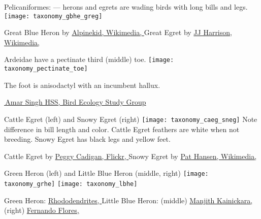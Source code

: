 \documentclass[t]{beamer}
\begin{document}
\begin{frame}{Pelicaniformes:  —  herons and egrets are wading birds with long bills and legs.}
\vspace{-0.5\baselineskip}
\centering
\texttt{[image: taxonomy\_gbhe\_greg]}

\vfilll
\tiny Great Blue Heron by \href{https://en.wikipedia.org/wiki/File:Great_Blue_Heron_at_Sunnyvale_California.jpg}{Alpinekid, Wikimedia, } \hfill Great Egret by \href{https://en.wikipedia.org/wiki/File:Ardea_modesta.jpg}{JJ Harrison, Wikimedia, }
\end{frame}

\begin{frame}{Ardeidae have a pectinate third (middle) toe.}
\texttt{[image: taxonomy\_pectinate\_toe]}

The foot is anisodactyl with an incumbent hallux.

\tinyfill \href{https://besgroup.org/2021/09/16/cattle-egret-pectinate-claw/}{\textcopyright\,Amar Singh HSS, Bird Ecology Study Group}

\end{frame}

\begin{frame}{Cattle Egret (left) and Snowy Egret (right)}
\texttt{[image: taxonomy\_caeg\_sneg]}
Note difference in bill length and color. Cattle Egret feathers are white when not breeding. Snowy Egret has black legs and yellow feet.

\vfilll

\tiny Cattle Egret by \href{https://flickr.com/photos/peggycadigan/14158508211}{Peggy Cadigan, Flickr, } \hfill Snowy Egret by \href{https://commons.wikimedia.org/wiki/File:Snowy_Egret-1.jpg}{Pat Hansen, Wikimedia, }
\end{frame}

\begin{frame}{Green Heron (left) and Little Blue Heron (middle, right)}
\texttt{[image: taxonomy\_grhe]}\hfill 
\texttt{[image: taxonomy\_lbhe]}

\vfilll

\tiny Green Heron: \href{https://commons.wikimedia.org/wiki/File:Green_heron_in_PP_(14296).jpg}{Rhododendrites, } \hfill Little Blue Heron: (middle) \href{https://flickr.com/photos/manjithkaini/4686037391}{Manjith Kainickara, }\hfill (right) \href{https://flickr.com/photos/ferjflores/10765140464}{Fernando Flores, }
\end{frame}
\end{document}

